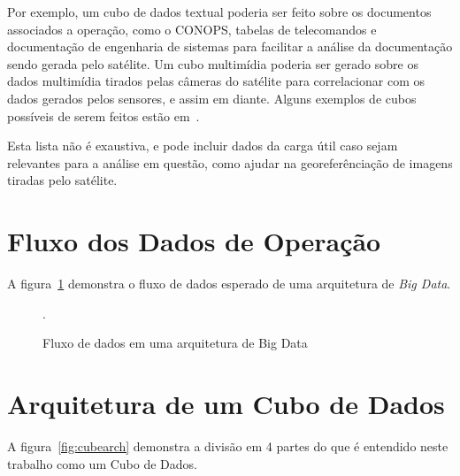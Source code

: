 Por exemplo, um cubo de dados textual poderia ser feito sobre os documentos associados a operação, como o CONOPS, tabelas de telecomandos e documentação de engenharia de sistemas para facilitar a análise da documentação sendo gerada pelo satélite. Um cubo multimídia poderia ser gerado sobre os dados multimídia tirados pelas câmeras do satélite para correlacionar com os dados gerados pelos sensores, e assim em diante. Alguns exemplos de cubos possíveis de serem feitos estão em~\cite{silva:2015:abordagensParaCubo}.

Esta lista não é exaustiva, e pode incluir dados da carga útil caso sejam relevantes para a análise em questão, como ajudar na georeferênciação de imagens tiradas pelo satélite.

\section{Fluxo dos Dados de Operação}

A figura~\ref{fig:bigdataflow} demonstra o fluxo de dados esperado de uma arquitetura de \textit{Big Data}.

\begin{figure}[ht]
	\caption{Fluxo de dados em uma arquitetura de Big Data}
	\vspace{6mm}
	\begin{center}
	\end{center}
	\vspace{2mm}
	\legenda{}
	.
	\label{fig:bigdataflow}
\end{figure}

\section{Arquitetura de um Cubo de Dados}

A figura~\ref{fig:cubearch} demonstra a divisão em 4 partes do que é entendido neste trabalho como um Cubo de Dados.

